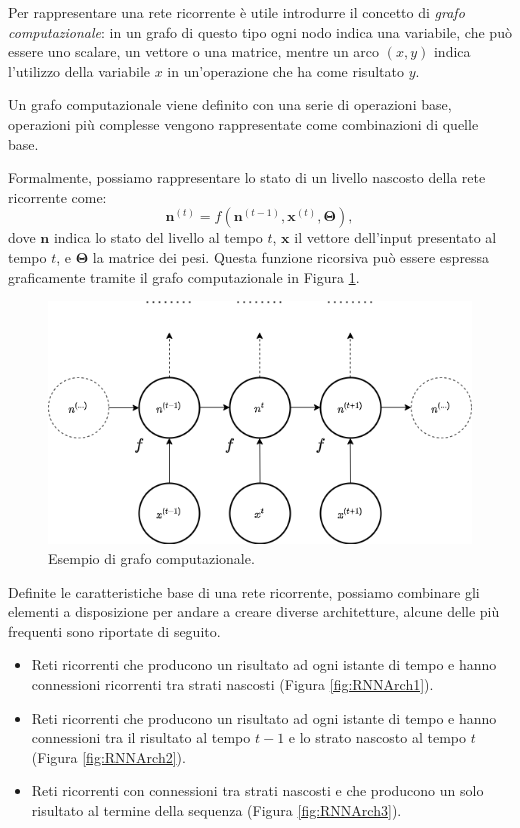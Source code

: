\documentclass[../../main.tex]{subfiles}
\begin{document}
Per rappresentare una rete ricorrente è utile introdurre il concetto di \textit{grafo computazionale}: in un grafo di questo tipo ogni nodo indica una variabile, che può essere uno scalare, un vettore o una matrice, mentre un arco $(x,y)$ indica l'utilizzo della variabile $x$ in un'operazione che ha come risultato $y$.

Un grafo computazionale viene definito con una serie di operazioni base, operazioni più complesse vengono rappresentate come combinazioni di quelle base.

Formalmente, possiamo rappresentare lo stato di un livello nascosto della rete ricorrente come:
\[\boldsymbol{n}^{(t)} = f(\boldsymbol{n}^{(t-1)}, \boldsymbol{x}^{(t)}, \boldsymbol{\Theta}),\]
dove $\boldsymbol{n}$ indica lo stato del livello al tempo $t$, $\boldsymbol{x}$ il vettore dell'input presentato al tempo $t$, e $\boldsymbol{\Theta}$ la matrice dei pesi. Questa funzione ricorsiva può essere espressa graficamente tramite il grafo computazionale in Figura \ref{fig:computationgraph}.
\begin{figure}[H]
    \centering
    \includegraphics[scale = 0.4]{immagini/4_2/computation_graph.png}
    \caption{Esempio di grafo computazionale.}
    \label{fig:computationgraph}
\end{figure}

Definite le caratteristiche base di una rete ricorrente, possiamo combinare gli elementi a disposizione per andare a creare diverse architetture, alcune delle più frequenti sono riportate di seguito.

\begin{itemize}
    \item Reti ricorrenti che producono un risultato ad ogni istante di tempo e hanno connessioni ricorrenti tra strati nascosti (Figura \ref{fig:RNNArch1}).
    \item Reti ricorrenti che producono un risultato ad ogni istante di tempo e hanno connessioni tra il risultato al tempo $t-1$ e lo strato nascosto al tempo $t$ (Figura \ref{fig:RNNArch2}).
    \item Reti ricorrenti con connessioni tra strati nascosti e che producono un solo risultato al termine della sequenza (Figura \ref{fig:RNNArch3}).
\end{itemize}
\end{document}
